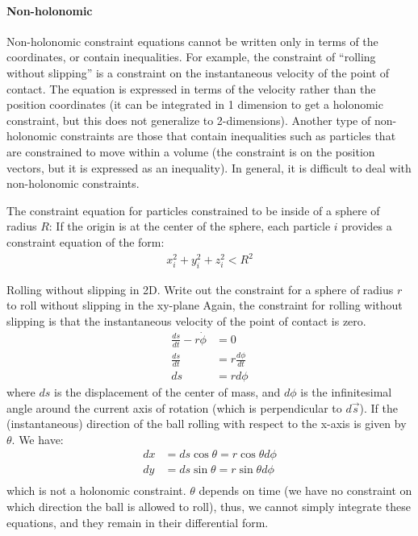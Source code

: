 \paragraph{Non-holonomic}
Non-holonomic constraint equations cannot be written only in terms of the coordinates, or contain inequalities. For example, the constraint of ``rolling without slipping'' is a constraint on the instantaneous velocity of the point of contact. The equation is expressed in terms of the velocity rather than the position coordinates (it can be integrated in 1 dimension to get a holonomic constraint, but this does not generalize to 2-dimensions). Another type of non-holonomic constraints are those that contain inequalities such as particles that are constrained to move within a volume (the constraint is on the position vectors, but it is expressed as an inequality). In general, it is difficult to deal with non-holonomic constraints.
\begin{example}{0pt}{The constraint equation for particles constrained to be inside of a sphere of radius $R$:}{}
If the origin is at the center of the sphere, each particle $i$ provides a constraint equation of the form:
\begin{align*}
x_i^2+y_i^2+z_i^2<R^2
\end{align*}
\end{example}
\begin{example}{0pt}{Rolling without slipping in 2D. Write out the constraint for a sphere of radius $r$ to roll without slipping in the xy-plane}{}
Again, the constraint for rolling without slipping is that the instantaneous velocity of the point of contact is zero. 
\begin{align*}
\frac{ds}{dt}-r\dot{\phi}&=0\nonumber\\
\frac{ds}{dt}&=r\frac{d\phi}{dt}\nonumber\\
ds&=r d\phi
\end{align*}
where $ds$ is the displacement of the center of mass, and $d\phi$ is the infinitesimal angle around the current axis of rotation (which is perpendicular to $d\vec{s}$). If the (instantaneous) direction of the ball rolling with respect to the x-axis is given by $\theta$. We have:
\begin{align*}
dx&=ds\cos{\theta} =r\cos{\theta}d\phi\nonumber\\
dy&=ds\sin{\theta} =r\sin{\theta}d\phi\nonumber\\
\end{align*}
which is not a holonomic constraint. $\theta$ depends on time (we have no constraint on which direction the ball is allowed to roll), thus, we cannot simply integrate these equations, and they remain in their differential form.
\end{example}
